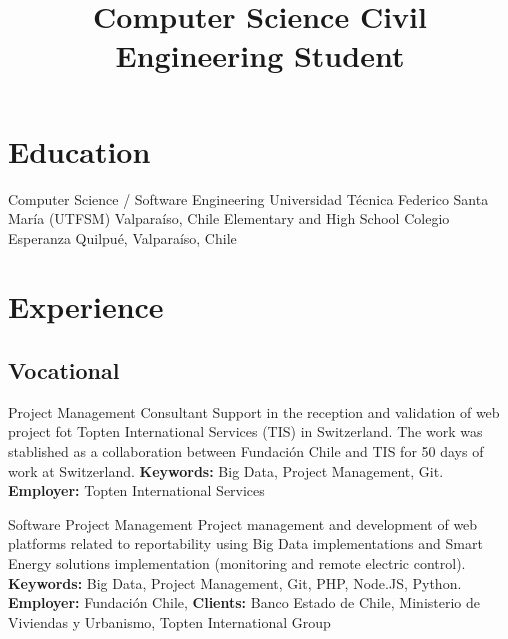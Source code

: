 \documentclass[11pt,a4paper,sans]{moderncv}
\title{Computer Science Civil Engineering Student}
\begin{document}
\maketitle




\section{Education}

        {Computer Science / Software Engineering}
        {Universidad Técnica Federico Santa María (UTFSM)}
        {Valparaíso, Chile}
        {}
        {}
        {Elementary and High School}
        {Colegio Esperanza}
        {Quilpué, Valparaíso, Chile}
        {}{}

\section{Experience}
\subsection{Vocational}

        {Project Management Consultant}
        {Support in the reception and validation of web project fot Topten International Services (TIS) in Switzerland. The work was stablished as a collaboration between Fundación Chile and TIS for 50 days of work at Switzerland.}
        {\textbf{Keywords:} Big Data, Project Management, Git.}
        {\textbf{Employer:} Topten International Services}
        {}

        {Software Project Management}
        {Project management and development of web platforms related to reportability using Big Data implementations and Smart Energy solutions implementation (monitoring and remote electric control).}
        {\textbf{Keywords:} Big Data, Project Management, Git, PHP, Node.JS, Python.}
        {\textbf{Employer:} Fundación Chile, \textbf{Clients:} Banco Estado de Chile, Ministerio de Viviendas y Urbanismo, Topten International Group}
        {}
\end{document}
